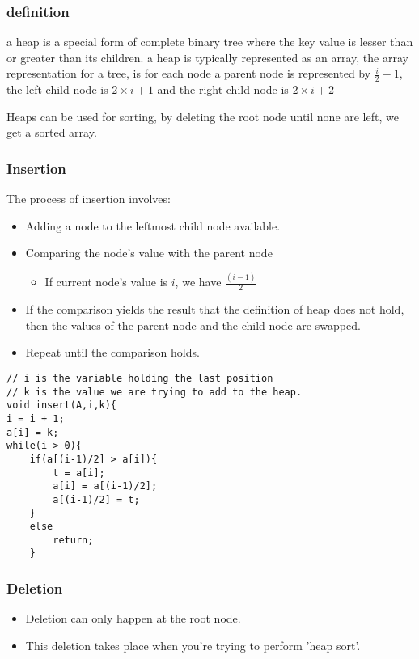 \documentclass[11pt]{article}
\begin{document}
\subsubsection{definition}
\label{sec:orgad4601c}
a heap is a special form of complete binary tree where the key value is lesser than or greater than its children.
a heap is typically represented as an array, the array representation for a tree, is for each node
a parent node is represented by \(\frac{i}{2} - 1\), the left child node is \(2\times i + 1\) and the right child node is \(2 \times i + 2\)

Heaps can be used for sorting, by deleting the root node until none are left, we get a sorted array.
\subsubsection{Insertion}
\label{sec:org98386f5}
The process of insertion involves:
\begin{itemize}
\item Adding a node to the leftmost child node available.
\item Comparing the node's value with the parent node
\begin{itemize}
\item If current node's value is \(i\), we have \(\frac{(i-1)}{2}\)
\end{itemize}
\item If the comparison yields the result that the definition of heap does not hold, then the values of the parent node and the child node are swapped.
\item Repeat until the comparison holds.
\end{itemize}

\begin{verbatim}
// i is the variable holding the last position
// k is the value we are trying to add to the heap.
void insert(A,i,k){
i = i + 1;
a[i] = k;
while(i > 0){
    if(a[(i-1)/2] > a[i]){
        t = a[i];
        a[i] = a[(i-1)/2];
        a[(i-1)/2] = t;
    }
    else
        return;
    }
\end{verbatim}
\subsubsection{Deletion}
\label{sec:org6e8de40}
\begin{itemize}
\item Deletion can only happen at the root node.
\item This deletion takes place when you're trying to perform 'heap sort'.
\end{itemize}
\end{document}
